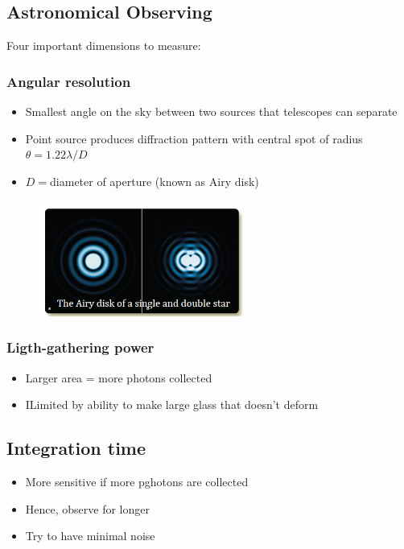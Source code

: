 \documentclass[a4paper]{article} %
\begin{document}
\subsection{Astronomical Observing}
Four important dimensions to measure:
\subsubsection{Angular resolution}
\begin{itemize}
\item Smallest angle on the sky between two sources that telescopes can separate
\item Point source produces diffraction pattern with central spot of radius $\theta=1.22\lambda/D$
\item $D=$diameter of aperture (known as Airy disk)
\end{itemize}

\begin{figure}[h]
\centering
\includegraphics[width=0.6\textwidth]{images/airy.png}
\end{figure}

\subsubsection{Ligth-gathering power}
\begin{itemize}
\item Larger area = more photons collected
\item ILimited by ability to make large glass that doesn't deform
\end{itemize}

\subsection{Integration time}
\begin{itemize}
\item More sensitive if more pghotons are collected
\item Hence, observe for longer
\item Try to have minimal noise
\end{itemize}
\end{document}
